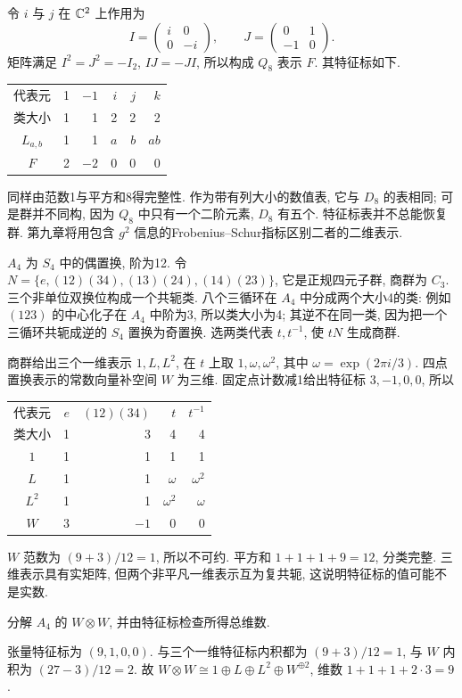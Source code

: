 令 $i$ 与 $j$ 在 $\mathbb C^2$ 上作用为
\[
 I=\begin{pmatrix}i&0\\0&-i\end{pmatrix},\qquad
 J=\begin{pmatrix}0&1\\-1&0\end{pmatrix}.
\]
矩阵满足 $I^2=J^2=-I_2$, $IJ=-JI$, 所以构成 $Q_8$ 表示 $F$. 其特征标如下.
\begin{center}
\begin{tabular}{c|rrrrr}
\toprule
代表元 &1&$-1$&$i$&$j$&$k$\\
类大小 &1&1&2&2&2\\\midrule
$L_{a,b}$&1&1&$a$&$b$&$ab$\\
$F$&2&$-2$&0&0&0\\\bottomrule
\end{tabular}
\end{center}
同样由范数1与平方和8得完整性. 作为带有列大小的数值表, 它与 $D_8$ 的表相同; 可是群并不同构, 因为 $Q_8$ 中只有一个二阶元素, $D_8$ 有五个. 特征标表并不总能恢复群. 第九章将用包含 $g^2$ 信息的Frobenius--Schur指标区别二者的二维表示.

$A_4$ 为 $S_4$ 中的偶置换, 阶为12. 令
$N=\{e,(12)(34),(13)(24),(14)(23)\}$, 它是正规四元子群, 商群为 $C_3$. 三个非单位双换位构成一个共轭类. 八个三循环在 $A_4$ 中分成两个大小4的类: 例如 $(123)$ 的中心化子在 $A_4$ 中阶为3, 所以类大小为4; 其逆不在同一类, 因为把一个三循环共轭成逆的 $S_4$ 置换为奇置换. 选两类代表 $t,t^{-1}$, 使 $tN$ 生成商群.

商群给出三个一维表示 $1,L,L^2$, 在 $t$ 上取 $1,\omega,\omega^2$, 其中 $\omega=\exp(2\pi i/3)$. 四点置换表示的常数向量补空间 $W$ 为三维. 固定点计数减1给出特征标 $3,-1,0,0$, 所以
\begin{center}
\begin{tabular}{c|rrrr}
\toprule
代表元 &$e$&$(12)(34)$&$t$&$t^{-1}$\\
类大小 &1&3&4&4\\\midrule
$1$&1&1&1&1\\
$L$&1&1&$\omega$&$\omega^2$\\
$L^2$&1&1&$\omega^2$&$\omega$\\
$W$&3&$-1$&0&0\\\bottomrule
\end{tabular}
\end{center}
$W$ 范数为 $(9+3)/12=1$, 所以不可约. 平方和 $1+1+1+9=12$, 分类完整. 三维表示具有实矩阵, 但两个非平凡一维表示互为复共轭, 这说明特征标的值可能不是实数.

\begin{exercise}
分解 $A_4$ 的 $W\otimes W$, 并由特征标检查所得总维数.
\end{exercise}
\begin{solution}
张量特征标为 $(9,1,0,0)$. 与三个一维特征标内积都为 $(9+3)/12=1$, 与 $W$ 内积为 $(27-3)/12=2$. 故 $W\otimes W\cong1\oplus L\oplus L^2\oplus W^{\oplus2}$, 维数 $1+1+1+2\cdot3=9$.
\end{solution}
